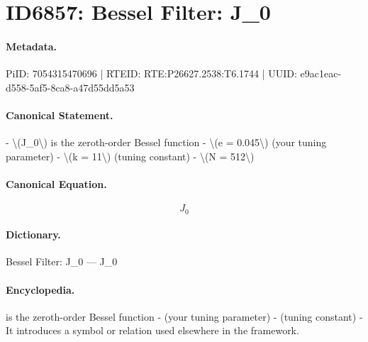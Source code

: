 \section*{ID6857: Bessel Filter: J\_0}
\paragraph{Metadata.}
PiID: 7054315470696 | RTEID: RTE:P26627.2538:T6.1744 | UUID: e9ac1eac-d558-5af5-8ca8-a47d55dd5a53

\paragraph{Canonical Statement.}
- \textbackslash{}(J\_0\textbackslash{}) is the zeroth-order Bessel function - \textbackslash{}(e = 0.045\textbackslash{}) (your tuning parameter) - \textbackslash{}(k = 11\textbackslash{}) (tuning constant) - \textbackslash{}(N = 512\textbackslash{})

\paragraph{Canonical Equation.}
\[
J_0
\]

\paragraph{Dictionary.}
Bessel Filter: J\_0 — J\_0

\paragraph{Encyclopedia.}
is the zeroth-order Bessel function - (your tuning parameter) - (tuning constant) - It introduces a symbol or relation used elsewhere in the framework.

